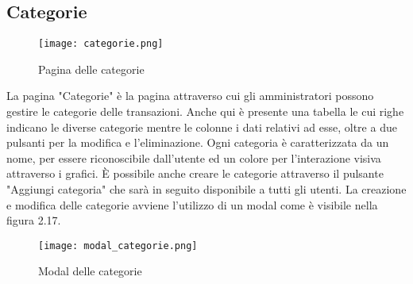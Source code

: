 \documentclass[binding=0.6cm, oneside, noexaminfo, italian]{sapthesis}
\begin{document}
\subsection{Categorie}
\begin{figure}[h]
    \centering
    \texttt{[image: categorie.png]}
    \caption{Pagina delle categorie}
    \label{fig:categorie}
\end{figure}
La pagina "Categorie" è la pagina attraverso cui gli amministratori possono gestire le categorie delle transazioni. Anche qui è presente una tabella le cui righe indicano le diverse categorie mentre le colonne i dati relativi ad esse, oltre a due pulsanti per la modifica e l'eliminazione. Ogni categoria è caratterizzata da un nome, per essere riconoscibile dall'utente ed un colore per l'interazione visiva attraverso i grafici. \MakeUppercase{è} possibile anche creare le categorie attraverso il pulsante "Aggiungi categoria" che sarà in seguito disponibile a tutti gli utenti. La creazione e modifica delle categorie avviene l'utilizzo di un modal come è visibile nella figura 2.17.
\begin{figure}[h]
    \centering
    \texttt{[image: modal\_categorie.png]}
    \caption{Modal delle categorie}
    \label{fig:modal_categorie}
\end{figure}
\end{document}
